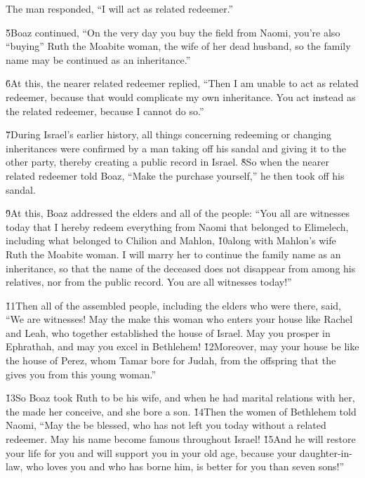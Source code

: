 The man responded, ``I will act as related redeemer.''

\v{5}Boaz continued, ``On the very day you buy the field from Naomi, you're also ``buying'' Ruth the Moabite woman, the wife of her dead husband, so the family name may be continued as an inheritance.''

\v{6}At this, the nearer related redeemer replied, ``Then I am unable to act as related redeemer, because that would complicate my own inheritance. You act instead as the related redeemer, because I cannot do so.''

\v{7}During Israel's earlier history, all things concerning redeeming or changing inheritances were confirmed by a man taking off his sandal and giving it to the other party, thereby creating a public record in Israel. \v{8}So when the nearer related redeemer told Boaz, ``Make the purchase yourself,'' he then took off his sandal.

\v{9}At this, Boaz addressed the elders and all of the people: ``You all are witnesses today that I hereby redeem everything from Naomi that belonged to Elimelech, including what belonged to Chilion and Mahlon, \v{10}along with Mahlon's wife Ruth the Moabite woman. I will marry her to continue the family name as an inheritance, so that the name of the deceased does not disappear from among his relatives, nor from the public record. You are all witnesses today!''

\v{11}Then all of the assembled people, including the elders who were there, said, ``We are witnesses! May the  make this woman who enters your house like Rachel and Leah, who together established the house of Israel. May you prosper in Ephrathah, and may you excel in Bethlehem! \v{12}Moreover, may your house be like the house of Perez, whom Tamar bore for Judah, from the offspring that the  gives you from this young woman.''

\v{13}So Boaz took Ruth to be his wife, and when he had marital relations with her, the  made her conceive, and she bore a son. \v{14}Then the women of Bethlehem told Naomi, ``May the  be blessed, who has not left you today without a related redeemer. May his name become famous throughout Israel! \v{15}And he will restore your life for you and will support you in your old age, because your daughter-in-law, who loves you and who has borne him, is better for you than seven sons!''

